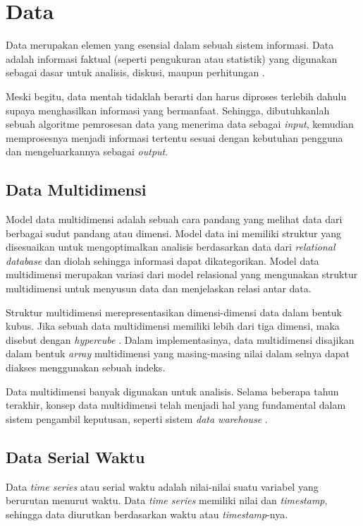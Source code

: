 \section{Data}
\tab Data merupakan elemen yang esensial dalam sebuah sistem informasi. Data adalah informasi faktual (seperti pengukuran atau statistik) yang digunakan sebagai dasar untuk analisis, diskusi, maupun perhitungan \cite{data}. 

Meski begitu, data mentah tidaklah berarti dan harus diproses terlebih dahulu supaya menghasilkan informasi yang bermanfaat. Sehingga, dibutuhkanlah sebuah algoritme pemrosesan data yang menerima data sebagai \textit{input}, kemudian memprosesnya menjadi informasi tertentu sesuai dengan kebutuhan pengguna dan mengeluarkannya sebagai \textit{output}.

\subsection{Data Multidimensi}
\tab Model data multidimensi adalah sebuah cara pandang yang melihat data dari berbagai sudut pandang atau dimensi. Model data ini memiliki struktur yang disesuaikan untuk mengoptimalkan analisis berdasarkan data dari \textit{relational database} dan diolah sehingga informasi dapat dikategorikan. Model data multidimensi merupakan variasi dari model relasional yang mengunakan struktur multidimensi untuk menyusun data dan menjelaskan relasi antar data.

Struktur multidimensi merepresentasikan dimensi-dimensi data dalam bentuk kubus. Jika sebuah data multidimensi memiliki lebih dari tiga dimensi, maka disebut dengan \textit{hypercube} \cite{multidimensional-database}. Dalam implementasinya, data multidimensi disajikan dalam bentuk \textit{array} multidimensi yang masing-masing nilai dalam selnya dapat diakses menggunakan sebuah indeks.

Data multidimensi banyak digunakan untuk analisis. Selama beberapa tahun terakhir, konsep data multidimensi telah menjadi hal yang fundamental dalam sistem pengambil keputusan, seperti sistem \textit{data warehouse} \cite{multidimensional-database}.

\subsection{Data Serial Waktu}
\tab Data \textit{time series} atau serial waktu adalah nilai-nilai suatu variabel yang berurutan menurut waktu. Data \textit{time series} memiliki nilai dan \textit{timestamp}, sehingga data diurutkan berdasarkan waktu atau \textit{timestamp}-nya.

